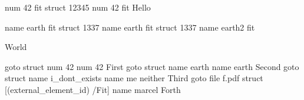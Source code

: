 
\pdfdest num 42 fit
\pdfdest struct 12345 num 42 fit %
Hello

\hfill\eject
\pdfdest name {earth} fit
\pdfdest struct 1337 name {earth} fit %
\pdfdest struct 1337 name {earth2} fit %

World

\vfill\eject
\leavevmode
\pdfstartlink goto struct num 42 num 42 First\pdfendlink
\space
\pdfstartlink goto struct name {earth} name {earth} Second\pdfendlink
\space
\pdfstartlink goto struct name {i_dont_exists} name {me neither} Third\pdfendlink
\space
\pdfstartlink goto file {f.pdf} struct {[(external_element_id) /Fit]} name {marcel} Forth\pdfendlink
\bye
